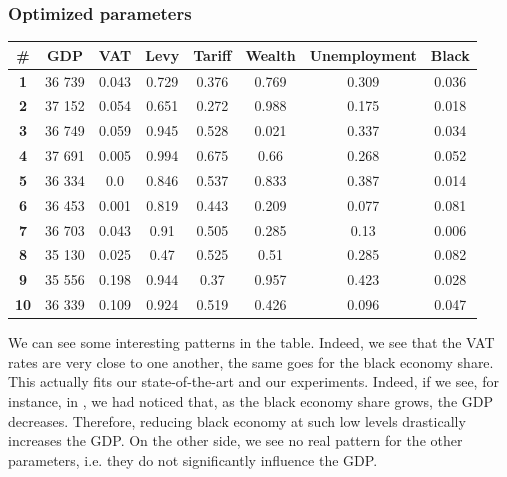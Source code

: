         \subsubsection{Optimized parameters}
        \begin{table}[H]
        \centering
        \begin{tabular}{|c|c|c|c|c|c|c|c|}
            \hline
            \textbf{\#} & \textbf{GDP}  & \textbf{VAT} & \textbf{Levy} & \textbf{Tariff} & \textbf{Wealth} & \textbf{Unemployment} & \textbf{Black} \\ \hline
            \textbf{1} & 36 739 & 0.043 & 0.729 & 0.376 & 0.769 & 0.309 & 0.036 \\ \hline
            \textbf{2} & 37 152 & 0.054 & 0.651 & 0.272 & 0.988 & 0.175 & 0.018 \\ \hline
            \textbf{3} & 36 749 & 0.059 & 0.945 & 0.528 & 0.021 & 0.337 & 0.034 \\ \hline
            \textbf{4} & 37 691 & 0.005 & 0.994 & 0.675 & 0.66 & 0.268 & 0.052 \\ \hline
            \textbf{5} & 36 334 & 0.0 & 0.846 & 0.537 & 0.833 & 0.387 & 0.014 \\ \hline
            \textbf{6} & 36 453 & 0.001 & 0.819 & 0.443 & 0.209 & 0.077 & 0.081 \\ \hline
            \textbf{7} & 36 703 & 0.043 & 0.91 & 0.505 & 0.285 & 0.13 & 0.006 \\ \hline
            \textbf{8} & 35 130 & 0.025 & 0.47 & 0.525 & 0.51 & 0.285 & 0.082 \\ \hline
            \textbf{9} & 35 556 & 0.198 & 0.944 & 0.37 & 0.957 & 0.423 & 0.028 \\ \hline
            \textbf{10} & 36 339 & 0.109 & 0.924 & 0.519 & 0.426 & 0.096 & 0.047 \\ \hline
        \end{tabular}
        \end{table}

        We can see some interesting patterns in the table. Indeed, we see that the VAT rates are very close to one another, the same goes for the black economy share. This actually fits our state-of-the-art and our experiments. Indeed, if we see, for instance, in , we had noticed that, as the black economy share grows, the GDP decreases. Therefore, reducing black economy at such low levels drastically increases the GDP.
        On the other side, we see no real pattern for the other parameters, i.e. they do not significantly influence the GDP.


